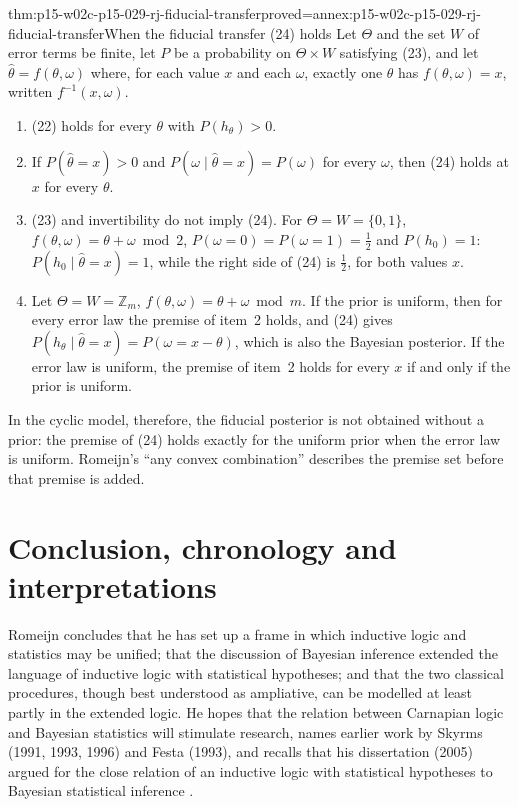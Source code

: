 \begin{hbtheorem}{thm:p15-w02c-p15-029-rj-fiducial-transfer}{proved=annex:p15-w02c-p15-029-rj-fiducial-transfer}{When the fiducial transfer (24) holds}
Let \(\Theta\) and the set \(W\) of error terms be finite, let \(P\) be
a probability on \(\Theta\times W\) satisfying (23), and let
\(\hat\theta=f(\theta,\omega)\) where, for each value \(x\) and each
\(\omega\), exactly one \(\theta\) has \(f(\theta,\omega)=x\), written
\(f^{-1}(x,\omega)\).
\begin{enumerate}
\item (22) holds for every \(\theta\) with \(P(h_\theta)>0\).
\item If \(P(\hat\theta=x)>0\) and \(P(\omega\mid\hat\theta=x)=P(\omega)\)
  for every \(\omega\), then (24) holds at \(x\) for every \(\theta\).
\item (23) and invertibility do not imply (24). For
  \(\Theta=W=\{0,1\}\), \(f(\theta,\omega)=\theta+\omega\bmod2\),
  \(P(\omega=0)=P(\omega=1)=\tfrac12\) and \(P(h_0)=1\):
  \(P(h_0\mid\hat\theta=x)=1\), while the right side of (24) is
  \(\tfrac12\), for both values \(x\).
\item Let \(\Theta=W=\mathbb Z_m\), \(f(\theta,\omega)=\theta+\omega\bmod m\).
  If the prior is uniform, then for every error law the premise of
  item~2 holds, and (24) gives \(P(h_\theta\mid\hat\theta=x)=P(\omega=x-\theta)\),
  which is also the Bayesian posterior. If the error law is uniform, the
  premise of item~2 holds for every \(x\) if and only if the prior is
  uniform.
\end{enumerate}
\end{hbtheorem}

In the cyclic model, therefore, the fiducial posterior is not obtained
without a prior: the premise of (24) holds exactly for the uniform
prior when the error law is uniform. Romeijn's ``any convex
combination'' describes the premise set before that premise is added.

\section{Conclusion, chronology and interpretations}
\label{sec:p15-w02c-p15-029-rj-assessment}

Romeijn concludes that he has set up a frame in which inductive logic
and statistics may be unified; that the discussion of Bayesian
inference extended the language of inductive logic with statistical
hypotheses; and that the two classical procedures, though best
understood as ampliative, can be modelled at least partly in the
extended logic. He hopes that the relation between Carnapian logic and
Bayesian statistics will stimulate research, names earlier work by
Skyrms (1991, 1993, 1996) and Festa (1993), and recalls that his
dissertation (2005) argued for the close relation of an inductive logic
with statistical hypotheses to Bayesian statistical inference
\cite[pp.~648--649]{Romeijn2011InductiveLogicStatistics}.

